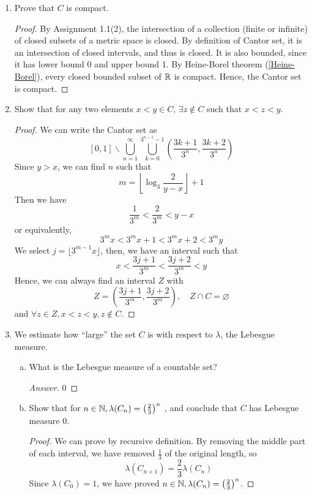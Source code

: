 \begin{enumerate}
	\item Prove that $C$ is compact.
    \begin{proof}
     By Assignment 1.1(2), the intersection of a collection (finite or infinite) of closed subsets of a metric space is closed.
     By definition of Cantor set, it is an intersection of closed intervals, and thus is closed.
     It is also bounded, since it has lower bound 0 and upper bound 1.
     By Heine-Borel theorem (\ref{Heine-Borel}), every closed bounded subset of $\mathbb{R}$ is compact.
     Hence, the Cantor set is compact.
    \end{proof}
    \item Show that for any two elements \(x<y\in C\), \(\exists z\notin C\) such that \(x<z<y\).
    \begin{proof}
    We can write the Cantor set as
    \[ [0,1]\backslash \bigcup_{n=1}^\infty \bigcup_{k=0}^{3^{n-1}-1}\left(\frac{3k+1}{3^n},\frac{3k+2}{3^n} \right) \]
    Since \(y>x\), we can find $n$ such that 
    \[ m=\left\lfloor \log_{3}{\frac{2}{y-x}} \right\rfloor+1 \]
    Then we have
    \[ \frac{1}{3^m}<\frac{2}{3^m}<y-x \]
    or equivalently,
    \[ 3^m x< 3^m x+1 < 3^m x +2 < 3^m y \]
    We select \(j=\lfloor 3^{m-1} x\rfloor\), then, we have an interval such that
    \[ x<\frac{3j+1}{3^m}<\frac{3j+2}{3^m}<y \]
    Hence, we can always find an interval $Z$ with
    \[ Z=\left(\frac{3j+1}{3^m}, \frac{3j+2}{3^m} \right), \quad Z\cap C=\varnothing \]
    and \(\forall z\in Z, x<z<y, z\notin C\).
    \end{proof}
    \item We estimate how ``large'' the set $C$ is with respect to $\lambda$, the Lebesgue measure.
    \begin{enumerate}[(a)]
    	\item What is the Lebesgue measure of a countable set? 
        \begin{proof}[Answer]
        0
        \end{proof}
        \item Show that for \(n\in\mathbb{N},\lambda(C_n)=\left(\frac{2}{3}\right)^n\) , and conclude that $C$ has Lebesgue measure 0.
        \begin{proof}
        We can prove by recursive definition.
        By removing the middle part of each interval, we have removed \(\frac{1}{3}\) of the original length, so
        \[ \lambda(C_{n+1})=\frac{2}{3}\lambda(C_n) \]
        Since \(\lambda(C_0)=1\), we have proved \(n\in\mathbb{N},\lambda(C_n)=\left(\frac{2}{3}\right)^n\).

\end{proof}
\end{enumerate}
\end{enumerate}

